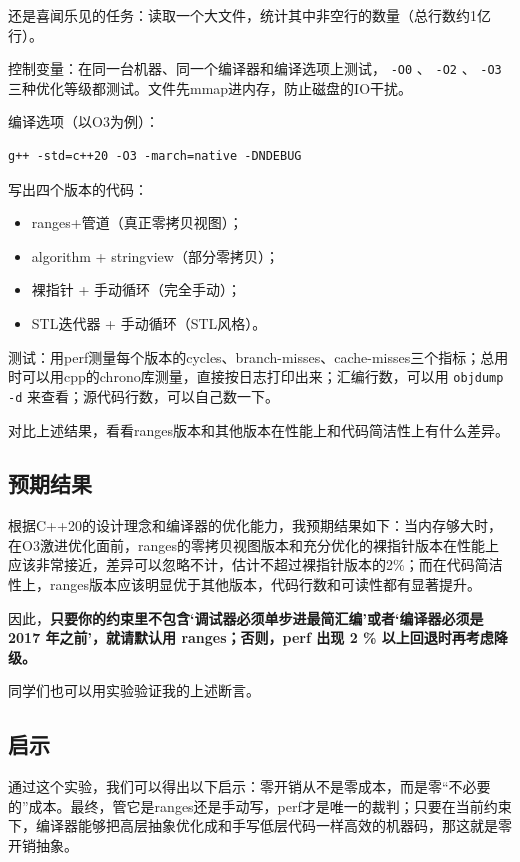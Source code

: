 还是喜闻乐见的任务：读取一个大文件，统计其中非空行的数量（总行数约1亿行）。

控制变量：在同一台机器、同一个编译器和编译选项上测试， \texttt{-O0} 、 \texttt{-O2} 、 \texttt{-O3} 三种优化等级都测试。文件先mmap进内存，防止磁盘的IO干扰。

编译选项（以O3为例）：
\begin{verbatim}
g++ -std=c++20 -O3 -march=native -DNDEBUG
\end{verbatim}

写出四个版本的代码：
\begin{itemize}
    \item ranges+管道（真正零拷贝视图）；
    \item algorithm + stringview（部分零拷贝）；
    \item 裸指针 + 手动循环（完全手动）；
    \item STL迭代器 + 手动循环（STL风格）。
\end{itemize}

测试：用perf测量每个版本的cycles、branch-misses、cache-misses三个指标；总用时可以用cpp的chrono库测量，直接按日志打印出来；汇编行数，可以用 \texttt{objdump -d} 来查看；源代码行数，可以自己数一下。

对比上述结果，看看ranges版本和其他版本在性能上和代码简洁性上有什么差异。

\subsection{预期结果}

根据C++20的设计理念和编译器的优化能力，我预期结果如下：当内存够大时，在O3激进优化面前，ranges的零拷贝视图版本和充分优化的裸指针版本在性能上应该非常接近，差异可以忽略不计，估计不超过裸指针版本的2\%；而在代码简洁性上，ranges版本应该明显优于其他版本，代码行数和可读性都有显著提升。

因此，\textbf{只要你的约束里不包含‘调试器必须单步进最简汇编’或者‘编译器必须是 2017 年之前’，就请默认用 ranges；否则，perf 出现 2 \% 以上回退时再考虑降级。}

同学们也可以用实验验证我的上述断言。

\subsection{启示}

通过这个实验，我们可以得出以下启示：零开销从不是零成本，而是零“不必要的”成本。最终，管它是ranges还是手动写，perf才是唯一的裁判；只要在当前约束下，编译器能够把高层抽象优化成和手写低层代码一样高效的机器码，那这就是零开销抽象。


